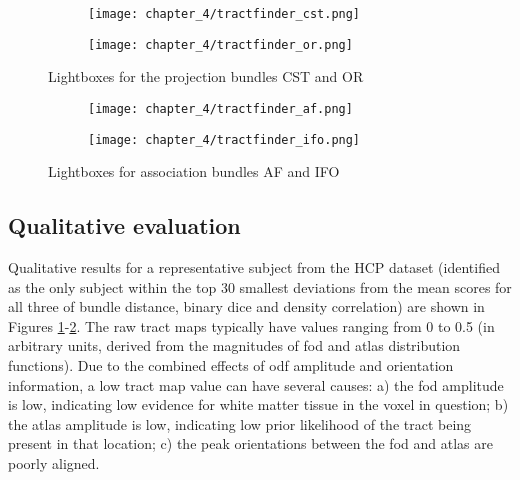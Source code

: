 

\begin{figure}[htb!]
  \centering
  \begin{subfigure}{0.8\textwidth}
    \texttt{[image: chapter\_4/tractfinder\_cst.png]}
    \caption{}
  \end{subfigure}
  \begin{subfigure}{0.8\textwidth}
    \texttt{[image: chapter\_4/tractfinder\_or.png]}
    \caption{}
  \end{subfigure}
  \caption{ Lightboxes for the projection bundles CST and OR}
  \label{fig:lb.cstor}
\end{figure}
\begin{figure}[htb!]
  \centering
  \begin{subfigure}{\textwidth}
    \texttt{[image: chapter\_4/tractfinder\_af.png]}
    \caption{}
  \end{subfigure}
  \begin{subfigure}{\textwidth}
    \texttt{[image: chapter\_4/tractfinder\_ifo.png]}
    \caption{}
  \end{subfigure}
  \caption{ Lightboxes for association bundles AF and IFO}
  \label{fig:lb.afifo}
\end{figure}

\clearpage
\subsection{Qualitative evaluation}

Qualitative results for a representative subject from the HCP dataset (identified as the only subject within the top 30 smallest deviations from the mean scores for all three of bundle distance, binary \gls{dice} and density correlation) are shown in Figures \ref{fig:lb.cstor}-\ref{fig:lb.afifo}.
The raw tract maps typically have values ranging from 0 to 0.5 (in arbitrary units, derived from the magnitudes of \gls{fod} and atlas distribution functions).
Due to the combined effects of \gls{odf} amplitude and orientation information, a low tract map value can have several causes: a) the \gls{fod} amplitude is low, indicating low evidence for white matter tissue in the voxel in question; b) the atlas amplitude is low, indicating low prior likelihood of the tract being present in that location; c) the peak orientations between the \gls{fod} and atlas are poorly aligned.


